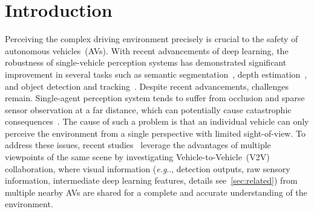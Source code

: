 \documentclass[runningheads]{llncs}
\makeatletter
\DeclareRobustCommand\onedot{\futurelet\@let@token\@onedot}
\def\@onedot{\ifx\@let@token.\else.\null\fi\xspace}
\def\eg{\emph{e.g}\onedot} \def\Eg{\emph{E.g}\onedot}
\makeatother
\begin{document}
\begin{abstract}
In this paper, we investigate the application of Vehicle-to-Everything (V2X) communication to improve the perception performance of autonomous vehicles. We present a robust cooperative perception framework with V2X communication using a novel vision Transformer. Specifically, we build a holistic attention model, namely V2X-ViT, to effectively fuse information across on-road agents (i.e., vehicles and infrastructure). V2X-ViT consists of alternating layers of heterogeneous multi-agent self-attention and multi-scale window self-attention, which captures inter-agent interaction and per-agent spatial relationships. These key modules are designed in a unified Transformer architecture to handle common V2X challenges, including asynchronous information sharing, pose errors, and heterogeneity of V2X components. To validate our approach, we create a large-scale V2X perception dataset using CARLA and OpenCDA. Extensive experimental results demonstrate that V2X-ViT sets new state-of-the-art performance for 3D object detection and achieves robust performance even under harsh, noisy environments. The code is available at \url{https://github.com/DerrickXuNu/v2x-vit}.
\end{abstract}


\section{Introduction}
\label{sec:intro}
Perceiving the complex driving environment precisely is crucial to the safety of autonomous vehicles~(AVs). With recent advancements of deep learning, the robustness of single-vehicle perception systems has demonstrated significant improvement in several tasks such as semantic segmentation~\cite{treml2016speeding,el2019rgb}, depth estimation~\cite{zhou2021r,9826399}, and object detection and tracking~\cite{lang2019pointpillars,liang2018deep,zhao2022track,fan2021deep}. Despite recent advancements, challenges remain. Single-agent perception system tends to suffer from occlusion and sparse sensor observation at a far distance, which can potentially cause catastrophic consequences~\cite{zhang2021safe}. The cause of such a problem is that an individual vehicle can only perceive the environment from a single perspective with limited sight-of-view. To address these issues, recent studies~\cite{wang2020v2vnet,chen2019cooper,xu2021opv2v,chen2019f,yuan2022keypoints,lei2022latency} leverage the advantages of multiple viewpoints of the same scene by investigating Vehicle-to-Vehicle~(V2V) collaboration, where visual information (\eg, detection outputs, raw sensory information, intermediate deep learning features, details see~\cref{sec:related}) from multiple nearby AVs are shared for a complete and accurate understanding of the environment.
\end{document}
